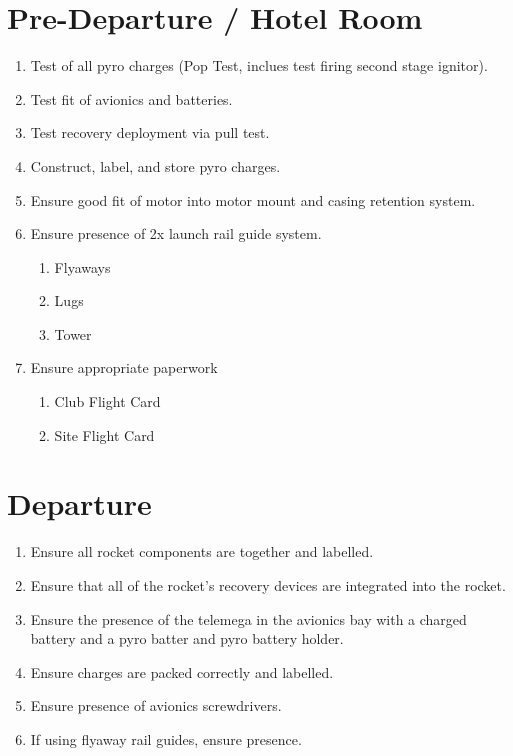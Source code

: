 \documentclass[12pt]{article}
\begin{document}
\section{Pre-Departure / Hotel Room}
\begin{addmargin}[3em]{3em}
	\begin{enumerate}[label=\thesection.\arabic*\quad$\square$]
		\item Test of all pyro charges (Pop Test, inclues test firing second stage ignitor).
		\item Test fit of avionics and batteries.
		\item Test recovery deployment via pull test.
		\item Construct, label, and store pyro charges.
		\item Ensure good fit of motor into motor mount and casing retention system.
		\item Ensure presence of 2x launch rail guide system.
		\begin{enumerate} [label=\thesection.\arabic{enumi}.\arabic*\quad$\square$]
			\item Flyaways
			\item Lugs
			\item Tower
		\end{enumerate}
		\item Ensure appropriate paperwork
		\begin{enumerate} [label=\thesection.\arabic{enumi}.\arabic*\quad$\square$]
			\item Club Flight Card
			\item Site Flight Card
		\end{enumerate}
	\end{enumerate}
\end{addmargin}
\section{Departure}
\begin{addmargin}[3em]{3em}
	\begin{enumerate}[label=\thesection.\arabic*\quad$\square$]
		\item Ensure all rocket components are together and labelled.
		\item Ensure that all of the rocket's recovery devices are integrated into the rocket.
		\item Ensure the presence of the telemega in the avionics bay with a charged battery and a pyro batter and pyro battery holder.
		\item Ensure charges are packed correctly and labelled.
		\item Ensure presence of avionics screwdrivers.
		\item If using flyaway rail guides, ensure presence.
	\end{enumerate}
\end{addmargin}
\end{document}
